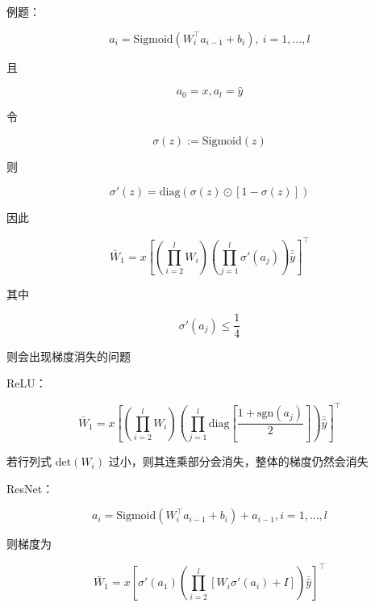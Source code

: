 \documentclass[openany,a4paper,12pt]{ctexbook}
\theoremstyle{kaiti}
\theoremstyle{normal}
\begin{document}
例题：

\begin{equation}
a_i=\mathrm{Sigmoid}\left(W_{i}^{\top}a_{i-1}+b_i \right),~i=1,\dots ,l
\end{equation}

且

\begin{equation}
a_0=x, a_l=\hat{y}
\end{equation}

令

\begin{equation}
\sigma \left(z \right):=\mathrm{Sigmoid}\left(z \right)
\end{equation}

则

\begin{equation}
\sigma '\left(z \right)=\mathrm{diag}\left(\sigma \left(z \right)\odot \left[1-\sigma \left(z \right)\right] \right)
\end{equation}

因此

\begin{equation}
\bar{W}_1=x\left[\left(\prod_{i=2}^{l}W_i \right)\left(\prod_{j=1}^{l}\sigma '\left(a_j \right)\right)\bar{\hat{y}} \right] ^{\top}
\end{equation}

其中

\begin{equation}
\sigma '\left(a_j \right)\leqslant \frac{1}{4}
\end{equation}

则会出现梯度消失的问题

ReLU：

\begin{equation}
\bar{W}_1=x\left[\left(\prod_{i=2}^{l}W_i \right)\left(\prod_{j=1}^{l}\mathrm{diag}\left[\frac{1+\mathrm{sgn} \left(a_j \right)}{2}\right] \right)\bar{\hat{y}} \right] ^{\top}
\end{equation}

若行列式 $\mathrm{det}(W_i)$ 过小，则其连乘部分会消失，整体的梯度仍然会消失

ResNet：

\begin{equation}
a_i=\mathrm{Sigmoid}\left(W_{i}^{\top}a_{i-1}+b_i \right)+a_{i-1},i=1,\dots ,l
\end{equation}

则梯度为

\begin{equation}
\bar{W}_1=x\left[\sigma '\left(a_1 \right)\left(\prod_{i=2}^{l}\left[ W_i\sigma '\left(a_i \right)+I \right] \right)\bar{\hat{y}} \right] ^{\top}
\end{equation}
\end{document}
